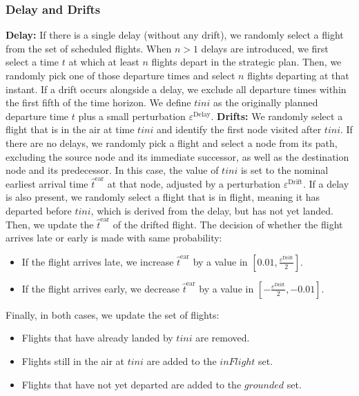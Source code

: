 \documentclass[../../thesis.tex]{subfiles}
\begin{document}
\subsubsection{Delay and Drifts}
\textbf{Delay:} If there is a single delay (without any drift), we randomly select a flight from the set of scheduled flights.  
When $n>1$ delays are introduced, we first select a time $t$ at which at least $n$ flights depart in the strategic plan. Then, we randomly pick one of those departure times and select $n$ flights departing at that instant.  
If a drift occurs alongside a delay, we exclude all departure times within the first fifth of the time horizon.  
We define $tini$ as the originally planned departure time $t$ plus a small perturbation $\varepsilon^\text{Delay}$.  
\newline\newline
\textbf{Drifts:} We randomly select a flight that is in the air at time $tini$ and identify the first node visited after $tini$.  
If there are no delays, we randomly pick a flight and select a node from its path, excluding the source node and its immediate successor, as well as the destination node and its predecessor.  
In this case, the value of $tini$ is set to the nominal earliest arrival time $\hat{t}^\text{ear}$ at that node, adjusted by a perturbation $\varepsilon^\text{Drift}$.  
If a delay is also present, we randomly select a flight that is in flight, meaning it has departed before $tini$, which is derived from the delay, but has not yet landed.   
Then, we update the $\hat{t}^\text{ear}$ of the drifted flight. The decision of whether the flight arrives late or early is made with same probability:  
\begin{itemize}
    \item If the flight arrives late, we increase $\hat{t}^\text{ear}$ by a value in $\left[0.01,\frac{\varepsilon^\text{Drift}}{2}\right]$.
    \item If the flight arrives early, we decrease $\hat{t}^\text{ear}$ by a value in $\left[-\frac{\varepsilon^\text{Drift}}{2},-0.01\right]$.
\end{itemize}

Finally, in both cases, we update the set of flights:  
\begin{itemize}
    \item Flights that have already landed by $tini$ are removed.
    \item Flights still in the air at $tini$ are added to the $inFlight$ set.
    \item Flights that have not yet departed are added to the $grounded$ set.
\end{itemize}
    
\end{document}
